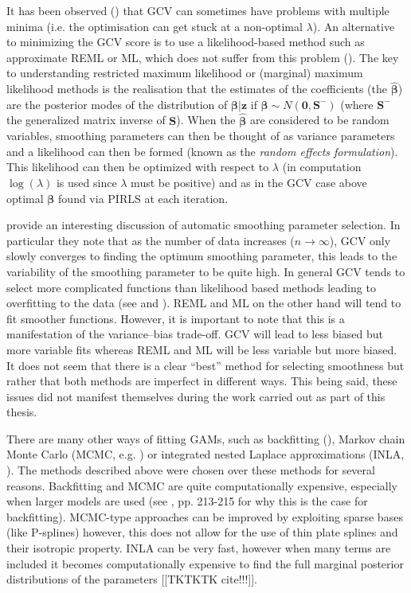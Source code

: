 It has been observed (\cite{reissogden}) that GCV can sometimes have problems with multiple minima (i.e. the optimisation can get stuck at a non-optimal $\lambda$). An alternative to minimizing the GCV score is to use a likelihood-based method such as approximate REML or ML, which does not suffer from this problem (\cite{remlpaper}). The key to understanding restricted maximum likelihood or (marginal) maximum likelihood methods is the realisation that the estimates of the coefficients (the $\bm{\hat{\beta}}$) are the posterior modes of the distribution of $\bm{\beta}|\mathbf{z}$ if $\bm{\beta} \sim N(\mathbf{0},\mathbf{S}^-)$ (where $\mathbf{S}^-$ the generalized matrix inverse of $\mathbf{S}$). When the $\bm{\hat{\beta}}$ are considered to be random variables, smoothing parameters can then be thought of as variance parameters and a likelihood can then be formed (known as the \textit{random effects formulation}).  This likelihood can then be optimized with respect to $\lambda$ (in computation $\log(\lambda)$ is used since $\lambda$ must be positive) and as in the GCV case above optimal $\bm{\beta}$ found via PIRLS at each iteration.

 provide an interesting discussion of automatic smoothing parameter selection. In particular they note that as the number of data increases ($n\rightarrow\infty$), GCV only slowly converges to finding the optimum smoothing parameter, this leads to the variability of the smoothing parameter to be quite high. In general GCV tends to select more complicated functions than likelihood based methods leading to overfitting to the data (see \cite{remlpaper} and \cite{reissogden}). REML and ML on the other hand will tend to fit smoother functions. However, it is important to note that this is a manifestation of the variance--bias trade-off. GCV will lead to less biased but more variable fits whereas REML and ML will be less variable but more biased. It does not seem that there is a clear ``best'' method for selecting smoothness but rather that both methods are imperfect in different ways. This being said, these issues did not manifest themselves during the work carried out as part of this thesis.

There are many other ways of fitting GAMs, such as backfitting (\cite{gammonograph}), Markov chain Monte Carlo (MCMC, e.g. \cite{fahrmeir2004}) or integrated nested Laplace approximations (INLA, \cite{inla}). The methods described above were chosen over these methods for several reasons. Backfitting and MCMC are quite computationally expensive, especially when larger models are used (see \cite{simonbook}, pp. 213-215 for why this is the case for backfitting). MCMC-type approaches can be improved by exploiting sparse bases (like P-splines) however, this does not allow for the use of thin plate splines and their isotropic property. INLA can be very fast, however when many terms are included it becomes computationally expensive to find the full marginal posterior distributions of the parameters [[TKTKTK cite!!!]].

